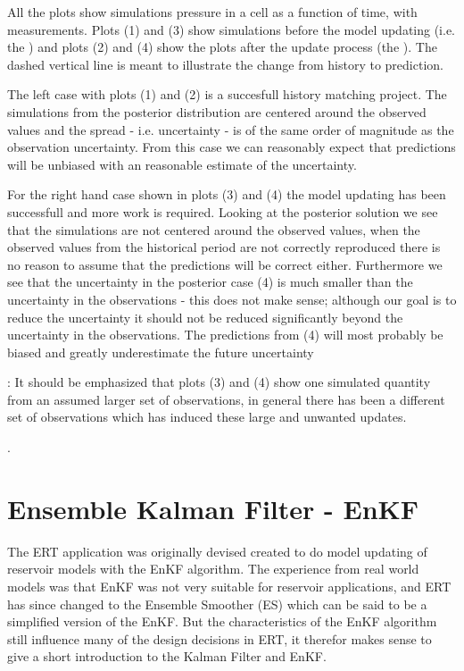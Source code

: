 \documentclass[letterpaper,10pt,english]{sphinxmanual}
\begin{document}
All the plots show simulations pressure in a cell as a function of time, with
measurements. Plots (1) and (3) show simulations before the model updating (i.e.
the ) and plots (2) and (4) show the plots after the update process (the
). The dashed vertical line is meant to illustrate the change from
history to prediction.

The left case with plots (1) and (2) is a succesfull history matching project.
The simulations from the posterior distribution are centered around the observed
values and the spread - i.e. uncertainty - is of the same order of magnitude as
the observation uncertainty. From this case we can reasonably expect that
predictions will be unbiased with an reasonable estimate of the uncertainty.

For the right hand case shown in plots (3) and (4) the model updating has 
been successfull and more work is required. Looking at the posterior solution we
see that the simulations are not centered around the observed values, when the
observed values from the historical period are not correctly reproduced there
is no reason to assume that the predictions will be correct either. Furthermore
we see that the uncertainty in the posterior case (4) is much smaller than the
uncertainty in the observations - this does not make sense; although our goal is
to reduce the uncertainty it should not be reduced significantly beyond the
uncertainty in the observations. The predictions from (4) will most probably be
biased and greatly underestimate the future uncertainty %
\begin{footnote}[1]\sphinxAtStartFootnote
: It should be emphasized that plots (3) and (4) show one simulated
quantity from an assumed larger set of observations, in general there
has been a different set of observations which has induced these large
and unwanted updates.
%
\end{footnote}.


\section{Ensemble Kalman Filter - EnKF}
\label{\detokenize{introduction/index:ensemble-kalman-filter-enkf}}
The ERT application was originally devised created to do model updating of
reservoir models with the EnKF algorithm. The experience from real world models
was that EnKF was not very suitable for reservoir applications, and ERT has
since changed to the Ensemble Smoother (ES) which can be said to be a simplified
version of the EnKF. But the characteristics of the EnKF algorithm still
influence many of the design decisions in ERT, it therefor makes sense to give a
short introduction to the Kalman Filter and EnKF.
\end{document}
